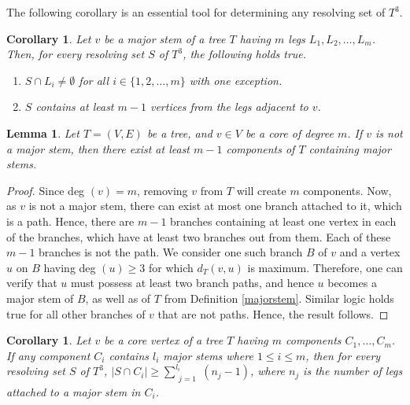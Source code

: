\documentclass{article}
\newtheorem{cor}[thm]{Corollary}
\newtheorem{lem}[thm]{Lemma}
\theoremstyle{definition}
\numberwithin{equation}{section}
\begin{document}
\noindent The following corollary is an essential tool for determining any resolving set of $T^{3}$. 

\begin{cor}\label{30}
Let $v$ be a major stem of a tree $T$ having $m$ legs $L_{1},L_{2},\hdots, L_{m}$. Then, for every resolving set $S$ of $T^{3}$, the following holds true.

\begin{enumerate}
\item $S\cap L_{i}\neq \emptyset$ for all $i\in \{1,2,\hdots,m\}$ with one exception.

\item $S$ contains at least $m-1$ vertices from the legs adjacent to $v$.
\end{enumerate}
\end{cor}

\begin{lem}\label{5}
Let $T=(V, E)$ be a tree, and $v\in V$ be a core of degree $m$. If $v$ is not a major stem, then there exist at least $m-1$ components of $T$ containing major stems.  
\end{lem}
  
\begin{proof}
Since deg $(v)=m$, removing $v$ from $T$ will create $m$ components. Now, as $v$ is not a major stem, there can exist at most one branch attached to it, which is a path. Hence, there are $m-1$ branches containing at least one vertex in each of the branches, which have at least two branches out from them. Each of these $m-1$ branches is not the path. We consider one such branch $B$ of $v$ and a vertex $u$ on $B$ having deg $(u)\geq 3$ for which $d_{T}(v,u)$ is maximum. Therefore, one can verify that $u$ must possess at least two branch paths, and hence $u$ becomes a major stem of $B$, as well as of $T$ from Definition \ref{majorstem}. Similar logic holds true for all other branches of $v$ that are not paths. Hence, the result follows.
\end{proof}


\begin{cor}\label{disjoint}
Let $v$ be a core vertex of a tree $T$ having $m$ components $C_{1}, \hdots, C_{m}$. If any component $C_{i}$ contains $l_{i}$ major stems where $1\leq i\leq m$, then for every resolving set $S$ of $T^{3}$, $|S \cap C_{i}|\geq \sum \limits_{\substack{j=1}}^{l_{i}} (n_{j}-1)$, where $n_{j}$ is the number of legs attached to a major stem in $C_{i}$.
\end{cor}
\end{document}
